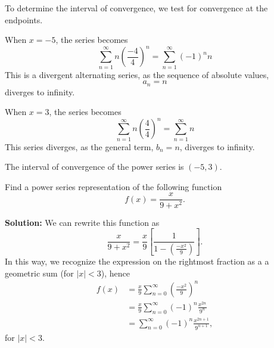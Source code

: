 \documentclass[11pt]{exam}
\begin{document}
\begin{questions}
To determine the interval of convergence, we test for convergence at the endpoints.

When $x=-5$, the series becomes
\begin{equation*}
\sum_{n=1}^{\infty}  n\left(\frac{-4}{4}\right)^n = \sum_{n=1}^{\infty} (-1)^n n
\end{equation*}
This is a divergent alternating series, as the sequence of absolute values,
\begin{equation*}
a_n=n
\end{equation*}
diverges to infinity. 

When $x=3$, the series becomes 
\begin{equation*}
\sum_{n=1}^{\infty}  n\left(\frac{4}{4}\right)^n = \sum_{n=1}^{\infty} n
\end{equation*}
This series diverges, as the general term, $b_n=n$, diverges to infinity. 

The interval of convergence of the power series is $(-5,3)$. 



\newpage
\addpoints
\question[3] Find a power series representation of the following function
\begin{equation*}
f(x)=\frac{x}{9+x^2}.
\end{equation*}

\textbf{Solution:} We can rewrite this function as 
\begin{equation*}
\frac{x}{9+x^2}=\frac{x}{9}\left[\frac{1}{1-\left(\frac{-x^2}{9}\right)}\right].
\end{equation*}
In this way, we recognize the expression on the rightmost fraction as a a geometric sum (for $|x|<3$), hence
\begin{align*}
f(x) & = \frac{x}{9}\sum_{n=0}^{\infty} \left(\frac{-x^2}{9}\right)^n \\
& = \frac{x}{9}\sum_{n=0}^{\infty} (-1)^n \frac{x^{2n}}{9^{n}} \\
& = \sum_{n=0}^{\infty} (-1)^n\frac{x^{2n+1}}{9^{n+1}}, 
\end{align*}
for $|x|<3$. 
\end{questions}
\end{document}
